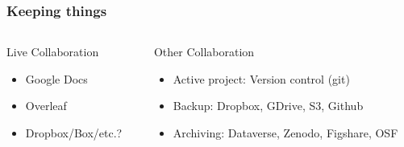 \documentclass[14pt]{beamer}
\begin{document}
\begin{frame}

\frametitle{Keeping things}

\begin{columns}[T]
\begin{column}{0.5\textwidth}
\begin{block}{Live Collaboration}
\begin{itemize}\itemsep2em
\item Google Docs
\item Overleaf
\item Dropbox/Box/etc.?
\end{itemize}
\end{block}
\end{column}
\begin{column}{0.5\textwidth}
\begin{block}{Other Collaboration}
\begin{itemize}
\item Active project: Version control (git)
\item Backup: Dropbox, GDrive, S3, Github
\item Archiving: Dataverse, Zenodo, Figshare, OSF
\end{itemize}
\end{block}
\end{column}
\end{columns}

\end{frame}


\end{document}
